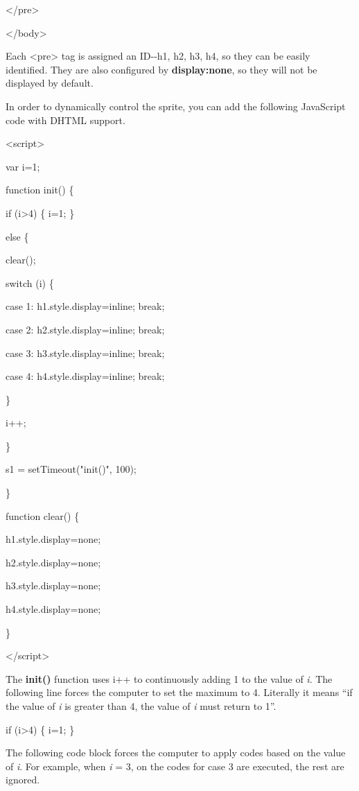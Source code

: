 \documentclass[
]{article}
\begin{document}
\textless/pre\textgreater{}

\textless/body\textgreater{}

Each \textless pre\textgreater{} tag is assigned an ID-\/-h1, h2, h3,
h4, so they can be easily identified. They are also configured by
\textbf{display:none}, so they will not be displayed by default.

In order to dynamically control the sprite, you can add the following
JavaScript code with DHTML support.

\textless script\textgreater{}

var i=1;

function init() \{

if (i\textgreater4) \{ i=1; \}

else \{

clear();

switch (i) \{

case 1: h1.style.display=\textquotesingle inline\textquotesingle; break;

case 2: h2.style.display=\textquotesingle inline\textquotesingle; break;

case 3: h3.style.display=\textquotesingle inline\textquotesingle; break;

case 4: h4.style.display=\textquotesingle inline\textquotesingle; break;

\}

i++;

\}

s1 = setTimeout("init()", 100);

\}

function clear() \{

h1.style.display=\textquotesingle none\textquotesingle;

h2.style.display=\textquotesingle none\textquotesingle;

h3.style.display=\textquotesingle none\textquotesingle;

h4.style.display=\textquotesingle none\textquotesingle;

\}

\textless/script\textgreater{}

The \textbf{init()} function uses i++ to continuously adding 1 to the
value of \emph{i}. The following line forces the computer to set the
maximum to 4. Literally it means ``if the value of \emph{i} is greater
than 4, the value of \emph{i} must return to 1''.

if (i\textgreater4) \{ i=1; \}

The following code block forces the computer to apply codes based on the
value of \emph{i}. For example, when \emph{i} = 3, on the codes for case
3 are executed, the rest are ignored.
\end{document}
